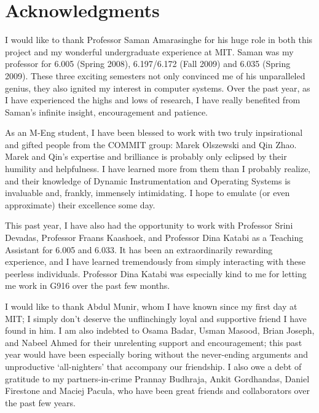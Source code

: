% 

\cleardoublepage

\section*{Acknowledgments}
I would like to thank Professor Saman Amarasinghe for his huge role in both this project 
and my wonderful undergraduate experience at MIT. Saman was my professor for 6.005 (Spring 2008), 
6.197/6.172 (Fall 2009) and 6.035 (Spring 2009). These three exciting semesters 
not only convinced me of his unparalleled genius, they also ignited my interest in computer systems.  
Over the past year, as I have experienced the highs and lows of research, I have 
really benefited from Saman's infinite insight, encouragement and patience. 
 
As an M-Eng student, I have been blessed to work with two truly inpsirational and gifted people from the COMMIT group:
Marek Olszewski and Qin Zhao. Marek and Qin's expertise and brilliance is probably only eclipsed by their humility and 
helpfulness. I have learned more from them than I probably realize, and their knowledge of Dynamic Instrumentation 
and Operating Systems is invaluable and, frankly, immensely intimidating. 
I hope to emulate (or even approximate) their excellence some day.

This past year, I have also had the opportunity to work with Professor Srini Devadas, 
Professor Fraans Kaashoek, and Professor Dina Katabi as a Teaching Assistant for 6.005 and 6.033. It has been an extraordinarily
rewarding experience, and I have learned tremendously from simply interacting with these peerless individuals. Professor
Dina Katabi was especially kind to me for letting me work in G916 over the past few months.

I would like to thank Abdul Munir, whom I have known since my first day at MIT; 
I simply don't deserve the unflinchingly loyal and supportive friend I have found in him. 
I am also indebted to Osama Badar, Usman Masood, Brian Joseph, and Nabeel Ahmed
for their unrelenting support and encouragement; this past year would have been especially 
boring without the never-ending arguments and unproductive `all-nighters' that accompany our friendship. 
I also owe a debt of gratitude to my partners-in-crime Prannay Budhraja, Ankit Gordhandas, Daniel Firestone 
and Maciej Pacula, who have been great friends and collaborators over the past few years. 

